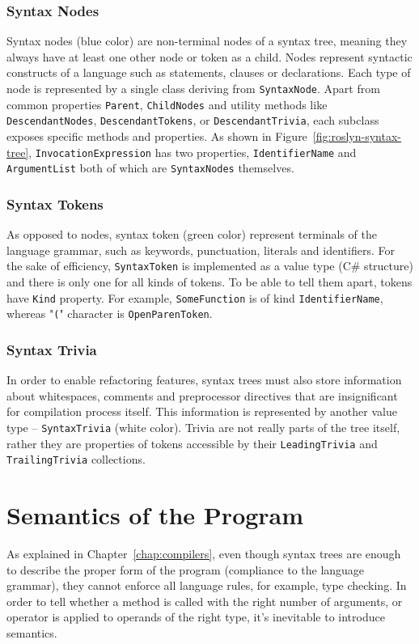 \documentclass[
  digital, %
  table,   %
  lof,     %
  lot,     %
  oneside,
]{fithesis3}
\begin{document}
\subsubsection{Syntax Nodes}
Syntax nodes (blue color) are non-terminal nodes of a syntax tree, meaning they always have at least one other node or token as a child. Nodes represent syntactic constructs of a language such as statements, clauses or declarations. Each type of node is represented by a single class deriving from \texttt{SyntaxNode}. Apart from common properties \texttt{Parent}, \texttt{ChildNodes} and utility methods like \texttt{DescendantNodes}, \texttt{DescendantTokens}, or \texttt{DescendantTrivia}, each subclass exposes specific methods and properties. As shown in Figure~\ref{fig:roslyn-syntax-tree}, \texttt{InvocationExpression} has two properties, \texttt{IdentifierName} and \texttt{ArgumentList} both of which are \texttt{SyntaxNodes} themselves.
 
\subsubsection{Syntax Tokens}
As opposed to nodes, syntax token (green color) represent terminals of the language grammar, such as keywords, punctuation, literals and identifiers. For the sake of efficiency, \texttt{SyntaxToken} is implemented as a value type (C\# structure) and there is only one for all kinds of tokens. To be able to tell them apart, tokens have \texttt{Kind} property. For example, \texttt{SomeFunction} is of kind \texttt{IdentifierName}, whereas "\texttt{(}" character is \texttt{OpenParenToken}.

\subsubsection{Syntax Trivia}
In order to enable refactoring features, syntax trees must also store information about whitespaces, comments and preprocessor directives that are insignificant for compilation process itself. This information is represented by another value type -- \texttt{SyntaxTrivia} (white color). Trivia are not really parts of the tree itself, rather they are properties of tokens accessible by their \texttt{LeadingTrivia} and \texttt{TrailingTrivia} collections.

\section{Semantics of the Program}
As explained in Chapter~\ref{chap:compilers}, even though syntax trees are enough to describe the proper form of the program (compliance to the language grammar), they cannot enforce all language rules, for example, type checking. In order to tell whether a method is called with the right number of arguments, or operator is applied to operands of the right type, it's inevitable to introduce semantics. 
\end{document}
